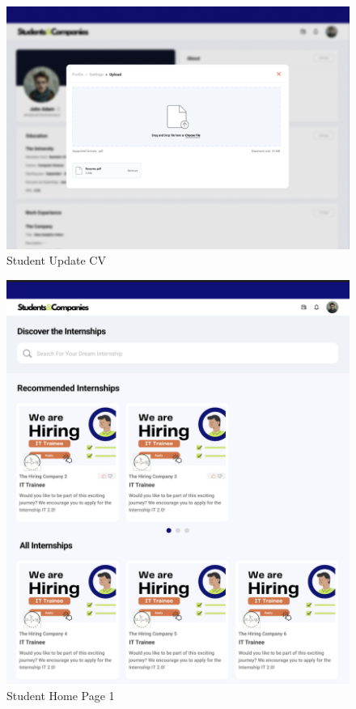 \documentclass[a4paper,12pt]{article}
\begin{document}
\begin{figure}[H]
    \centering
    \includegraphics[scale = 0.42]{figures/UserInterfaces/Student/UploadCv.png}
    \caption{Student Update CV}
     \centering
\end{figure}

    \begin{figure}[H]
    \centering
    \includegraphics[scale = 0.40]{figures/UserInterfaces/Student/HomePage1.png}
    \caption{Student Home Page 1}
     \centering
\end{figure}
\end{document}
